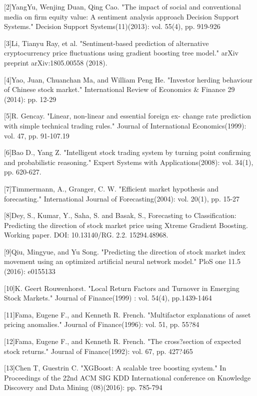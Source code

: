 \documentclass[letterpaper]{article}
\begin{document}
[2]YangYu, Wenjing Duan, Qing Cao. "The impact of social and conventional media on firm equity value: A sentiment analysis approach 
Decision Support Systems." Decision Support Systems(11)(2013): vol. 55(4), pp. 919-926

[3]Li, Tianyu Ray, et al. "Sentiment-based prediction of alternative cryptocurrency price fluctuations using gradient boosting tree model." arXiv preprint arXiv:1805.00558 (2018).  

[4]Yao, Juan, Chuanchan Ma, and William Peng He. "Investor herding behaviour of Chinese stock market." International Review of Economics \& Finance 29 (2014): pp. 12-29

[5]R. Gencay. "Linear, non-linear and essential foreign ex-
change rate prediction with simple technical trading rules." Journal of International Economics(1999): vol. 47, pp. 91-107.19

[6]Bao D., Yang Z. "Intelligent stock trading system by turning point confirming and probabilistic reasoning." Expert Systems with Applications(2008): vol. 34(1), pp. 620-627.

[7]Timmermann, A., Granger, C. W.  "Efficient market hypothesis and forecasting." International Journal of Forecasting(2004): vol. 20(1), pp. 15-27 

[8]Dey, S., Kumar, Y., Saha, S. and Basak, S., Forecasting to Classification: Predicting the direction of stock market price using Xtreme Gradient Boosting. Working paper. DOI: 10.13140/RG. 2.2. 15294.48968.

[9]Qiu, Mingyue, and Yu Song. "Predicting the direction of stock market index movement using an optimized artificial neural network model." PloS one 11.5 (2016): e0155133

[10]K. Geert Rouwenhorst. "Local Return Factors and Turnover in Emerging Stock Markets." Journal of Finance(1999) : vol. 54(4), pp.1439-1464

[11]Fama, Eugene F., and Kenneth R. French. "Multifactor explanations of asset pricing anomalies." Journal of Finance(1996): vol. 51, pp. 55?84

[12]Fama, Eugene F., and Kenneth R. French. "The cross?section of expected stock returns." Journal of Finance(1992): vol. 67, pp. 427?465

[13]Chen T, Guestrin C. "XGBoost: A scalable tree boosting system." In Proceedings of the 22nd ACM SIG KDD International conference on Knowledge Discovery and Data Mining (08)(2016): pp. 785-794
\end{document}
